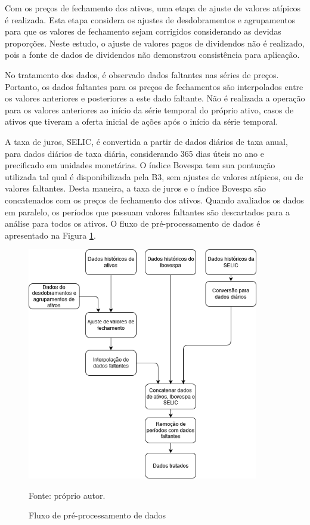         \ipar Com os preços de fechamento dos ativos, uma etapa de ajuste de valores atípicos é realizada. Esta etapa considera os ajustes de desdobramentos e agrupamentos para que os valores de fechamento sejam corrigidos considerando as devidas proporções. Neste estudo, o ajuste de valores pagos de dividendos não é realizado, pois a fonte de dados de dividendos não demonstrou consistência para aplicação. 

        \ipar No tratamento dos dados, é observado dados faltantes nas séries de preços. Portanto, os dados faltantes para os preços de fechamentos são interpolados entre os valores anteriores e posteriores a este dado faltante. Não é realizada a operação para os valores anteriores ao início da série temporal do próprio ativo, casos de ativos que tiveram a oferta inicial de ações após o início da série temporal.

        \ipar A taxa de juros, SELIC, é convertida a partir de dados diários de taxa anual, para dados diários de taxa diária, considerando 365 dias úteis no ano e precificado em unidades monetárias. O índice Bovespa tem sua pontuação utilizada tal qual é disponibilizada pela B3, sem ajustes de valores atípicos, ou de valores faltantes. Desta maneira, a taxa de juros e o índice Bovespa são concatenados com os preços de fechamento dos ativos. Quando avaliados os dados em paralelo, os períodos que possuam valores faltantes são descartados para a análise para todos os ativos. O fluxo de pré-processamento de dados é apresentado na Figura \ref{fig:fluxo_preprocessamento}.

        \begin{figure}[htp]
            \centering
            \caption{Fluxo de pré-processamento de dados}
            \label{fig:fluxo_preprocessamento}
            \includegraphics[width=0.9\textwidth]{imagens/fluxo_tratamento.png}
            \par \footnotesize Fonte: próprio autor.
        \end{figure}

